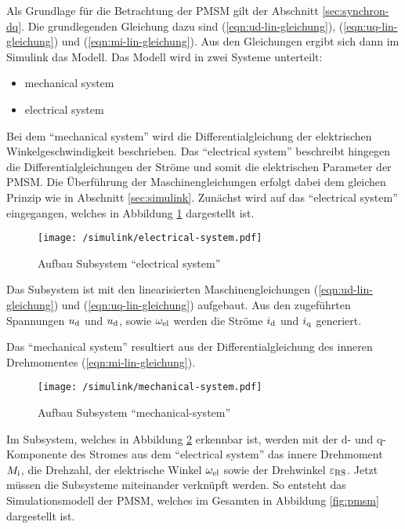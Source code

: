 Als Grundlage für die Betrachtung der PMSM gilt der Abschnitt \ref{sec:synchron-dq}.
Die grundlegenden Gleichung dazu sind (\ref{eqn:ud-lin-gleichung}), (\ref{eqn:uq-lin-gleichung}) und (\ref{eqn:mi-lin-gleichung}).
Aus den Gleichungen ergibt sich dann im Simulink das Modell.
Das Modell wird in zwei Systeme unterteilt:

\begin{itemize}
	\item mechanical system
	\item electrical system
\end{itemize}

Bei dem \enquote{mechanical system} wird die Differentialgleichung der elektrischen Winkelgeschwindigkeit beschrieben.
Das \enquote{electrical system} beschreibt hingegen die Differentialgleichungen der Ströme und somit die elektrischen Parameter der PMSM.
Die Überführung der Maschinengleichungen erfolgt dabei dem gleichen Prinzip wie in Abschnitt \ref{sec:simulink}.
Zunächst wird auf das \enquote{electrical system} eingegangen, welches in Abbildung \ref{fig:electrical-system} dargestellt ist.

\begin{figure}[h]
	\centering
	\texttt{[image: /simulink/electrical-system.pdf]}
	\label{fig:electrical-system}
	\caption{Aufbau Subsystem \enquote{electrical system}}
\end{figure}

Das Subsystem ist mit den linearisierten Maschinengleichungen (\ref{eqn:ud-lin-gleichung}) und (\ref{eqn:uq-lin-gleichung}) aufgebaut. 
Aus den zugeführten Spannungen $u_{\mathrm{d}}$ und $u_{\mathrm{d}}$, sowie $\omega_{\mathrm{el}}$ werden die Ströme $i_{\mathrm{d}}$ und $i_{\mathrm{q}}$ generiert.

Das \enquote{mechanical system} resultiert aus der Differentialgleichung des inneren Drehmomentes (\ref{eqn:mi-lin-gleichung}).

\begin{figure}[h]
	\centering
	\texttt{[image: /simulink/mechanical-system.pdf]}
	\label{fig:mechanical-system}
	\caption{Aufbau Subsystem \enquote{mechanical-system}}
\end{figure}

Im Subsystem, welches in Abbildung \ref{fig:mechanical-system} erkennbar ist, werden mit der d- und q-Komponente des Stromes aus dem \enquote{electrical system} das innere Drehmoment $M_{\mathrm{i}}$, die Drehzahl, der elektrische Winkel $\omega_{\mathrm{el}}$ sowie der Drehwinkel $\varepsilon_{\mathrm{RS}}$.
Jetzt müssen die Subsysteme miteinander verknüpft werden.
So entsteht das Simulationsmodell der PMSM, welches im Gesamten in Abbildung \ref{fig:pmsm} dargestellt ist.

